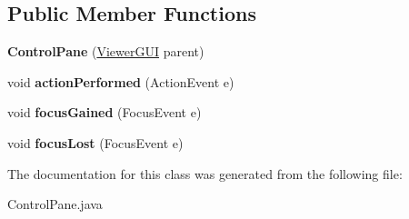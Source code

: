 \subsection*{Public Member Functions}
\begin{DoxyCompactItemize}
\item 
\hypertarget{class_control_pane_a1c330f498e14b6054709854eaec034c9}{{\bfseries Control\-Pane} (\hyperlink{class_viewer_g_u_i}{Viewer\-G\-U\-I} parent)}\label{class_control_pane_a1c330f498e14b6054709854eaec034c9}

\item 
\hypertarget{class_control_pane_af35ca5536e4b94d83dd308b97eaa9b7b}{void {\bfseries action\-Performed} (Action\-Event e)}\label{class_control_pane_af35ca5536e4b94d83dd308b97eaa9b7b}

\item 
\hypertarget{class_control_pane_a2994c5fed9033e309f4e1efa18a77a29}{void {\bfseries focus\-Gained} (Focus\-Event e)}\label{class_control_pane_a2994c5fed9033e309f4e1efa18a77a29}

\item 
\hypertarget{class_control_pane_a26ae6778853f590a9e501f759cce3f13}{void {\bfseries focus\-Lost} (Focus\-Event e)}\label{class_control_pane_a26ae6778853f590a9e501f759cce3f13}

\end{DoxyCompactItemize}


The documentation for this class was generated from the following file\-:\begin{DoxyCompactItemize}
\item 
Control\-Pane.\-java\end{DoxyCompactItemize}
